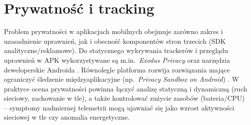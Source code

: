 \section{Prywatność i tracking}
Problem prywatności w aplikacjach mobilnych obejmuje zarówno zakres i uzasadnienie uprawnień, jak i obecność komponentów stron trzecich (SDK analityczne/reklamowe). Do statycznego wykrywania trackerów i przeglądu uprawnień w APK wykorzystywane są m.in.\ \textit{Exodus Privacy} oraz narzędzia deweloperskie Androida \cite{ExodusPrivacy,AndroidPermissionsOverview}. Równolegle platforma rozwija rozwiązania mające ograniczyć śledzenie międzyaplikacyjne (np.\ \emph{Privacy Sandbox on Android}) \cite{PrivacySandboxAndroid}. W praktyce ocena prywatności powinna łączyć analizę statyczną i dynamiczną (ruch sieciowy, zachowanie w tle), a także kontrolować zużycie zasobów (bateria/CPU) – symptomy nadmiernej telemetrii mogą ujawniać się jako wzrost aktywności sieciowej w tle czy anomalia energetyczne.
